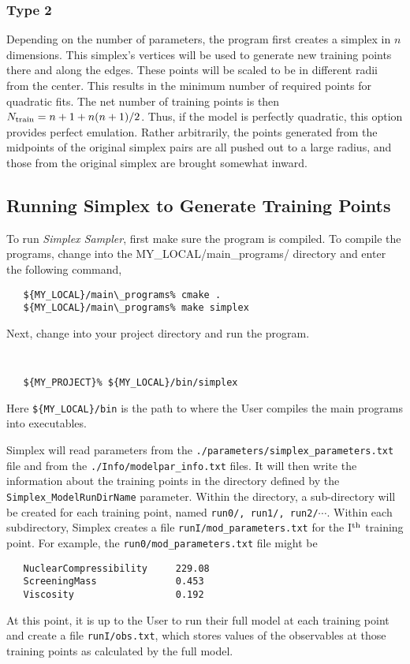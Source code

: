 \documentclass[UserManual.tex]{subfiles}
\begin{document}
 \subsubsection{Type 2}

 Depending on the number of parameters, the program first creates a simplex in $n$ dimensions. This simplex's vertices will be used to generate new training points there and along the edges. These points will be scaled to be in different radii from the center. This results in the minimum number of required points for quadratic fits. The net number of training points is then $N_{\rm train}=n+1+n(n+1)/2$.  Thus, if the model is perfectly quadratic, this option provides perfect emulation. Rather arbitrarily, the points generated from the midpoints of the original simplex pairs are all pushed out to a large radius, and those from the original simplex are brought somewhat inward.
 
\subsection{Running Simplex to Generate Training Points}

To run {\it Simplex Sampler}, first make sure the program is compiled. To compile the programs, change into the {MY\_LOCAL/main\_programs/} directory and enter the following command,

\begin{verbatim}
   ${MY_LOCAL}/main\_programs% cmake .
   ${MY_LOCAL}/main\_programs% make simplex
\end{verbatim}

Next, change into your project directory and run the program.
{\tt
\begin{verbatim}
   ${MY_PROJECT}% ${MY_LOCAL}/bin/simplex 
\end{verbatim}
}
Here {\tt \$\{MY\_LOCAL\}/bin} is the path to where the User compiles the main programs into executables. 

Simplex will read parameters from the {\tt ./parameters/simplex\_parameters.txt} file and from the {\tt ./Info/modelpar\_info.txt} files. It will then write the information about the training points in the directory defined by the {\tt Simplex\_ModelRunDirName} parameter. Within the directory, a sub-directory will be created for each training point, named {\tt run0/, run1/, run2/}$\cdots$. Within each subdirectory, Simplex creates a file {\tt runI/mod\_parameters.txt} for the I$^{\rm th}$ training point. For example, the {\tt run0/mod\_parameters.txt} file might be
{\tt\begin{verbatim}
   NuclearCompressibility     229.08
   ScreeningMass              0.453
   Viscosity                  0.192
\end{verbatim}
}
At this point, it is up to the User to run their full model at each training point and create a file {\tt runI/obs.txt}, which stores values of the observables at those training points as calculated by the full model. 
\end{document}
